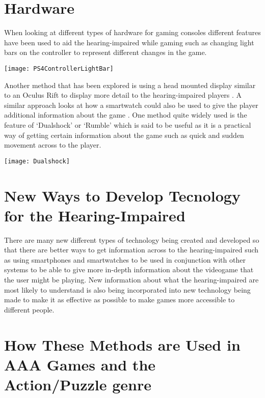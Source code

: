 \documentclass{scrartcl}
\begin{document}
\section{Hardware}

When looking at different types of hardware for gaming consoles different features have been used to aid the hearing-impaired while gaming such as changing light bars on the controller to represent different changes in the game.

\texttt{[image: PS4ControllerLightBar]}

Another method that has been explored is using a head mounted display similar to an Oculus Rift to display more detail to the hearing-impaired players \cite{Jones}. A similar approach looks at how a smartwatch could also be used to give the player additional information about the game \cite{Mielke}.
One method quite widely used is the feature of `Dualshock' or `Rumble' which is said to be useful as it is a practical way \cite{Distante} of getting certain information about the game such as quick and sudden movement across to the player.

\begin{center}
	\texttt{[image: Dualshock]}
\end{center}
\section{New Ways to Develop Tecnology for the Hearing-Impaired}

There are many new different types of technology being created and developed so that there are better ways to get information across to the hearing-impaired such as using smartphones and smartwatches \cite{Mielke} to be used in conjunction with other systems to be able to give more in-depth information about the videogame that the user might be playing. New information about what the hearing-impaired are most likely to understand \cite{Lawrence} is also being incorporated into new technology being made to make it as effective as possible to make games more accessible to different people.

\section{How These Methods are Used in AAA Games and the Action/Puzzle genre}
\end{document}
